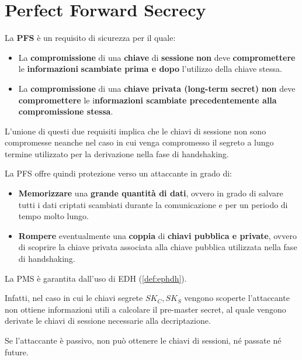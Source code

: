 \section{Perfect Forward Secrecy}
La \textbf{PFS} è un requisito di sicurezza per il quale:
\begin{definition}\label{def:pfs}
\begin{itemize}
    \item La \textbf{compromissione} di una \textbf{chiave} di \textbf{sessione} \textbf{non} deve \textbf{compromettere} le \textbf{informazioni}\textbf{ scambiate prima e dopo} l'utilizzo della chiave stessa.
    \item La \textbf{compromissione} di una \textbf{chiave privata (long-term secret)} \textbf{non} deve \textbf{compromettere} le i\textbf{nformazioni scambiate precedentemente alla compromissione stessa}.
\end{itemize}
\end{definition}
\begin{remark}
L’unione di questi due requisiti implica che le chiavi di sessione non sono compromesse neanche nel caso in cui venga compromesso il segreto a lungo termine utilizzato per la derivazione nella fase di handshaking.
\end{remark}
La PFS offre quindi protezione verso un attaccante in grado di:
\begin{itemize}
    \item \textbf{Memorizzare} una \textbf{grande quantità di dati}, ovvero in grado di salvare tutti i dati criptati scambiati durante la comunicazione e per un periodo di tempo molto lungo.
    \item \textbf{Rompere} eventualmente una \textbf{coppia} di \textbf{chiavi pubblica e private}, ovvero di scoprire la chiave privata associata alla chiave pubblica utilizzata nella fase di handshaking.
\end{itemize}
\begin{theorem}
La PMS è garantita dall'uso di EDH (\cref{def:ephdh}).
\end{theorem}
 Infatti, nel caso in cui le chiavi segrete $SK_C, SK_S$ vengono scoperte l’attaccante non ottiene informazioni utili a calcolare il pre-master secret, al quale vengono derivate le chiavi di sessione necessarie alla decriptazione.\\
\begin{remark}
Se l'attaccante è passivo, non può ottenere le chiavi di sessioni, né passate né future.
\end{remark}
